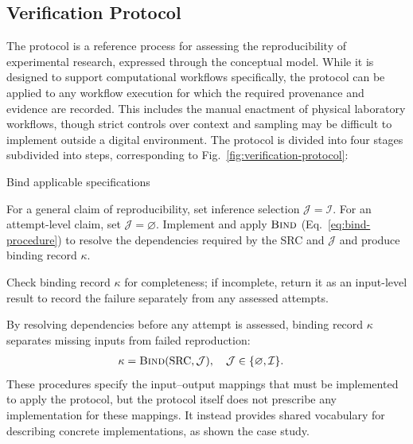 \documentclass[conference,a4paper]{IEEEtran}
\newlength{\PaperStrokeWidth}
\begin{document}
  \subsection{Verification Protocol}
  \label{sec:verification-protocol}
  The protocol is a reference process for assessing the reproducibility of experimental research, expressed through the conceptual model. While it is designed to support computational workflows specifically, the protocol can be applied to any workflow execution for which the required provenance and evidence are recorded. This includes the manual enactment of physical laboratory workflows, though strict controls over context and sampling may be difficult to implement outside a digital environment. The protocol is divided into four stages subdivided into steps, corresponding to Fig.~\ref{fig:verification-protocol}:

  \VerificationProtocolFigure{\PaperStrokeWidth}

  \begin{protocolstage}{Bind applicable specifications}
    \label{stage:protocol-bind}
    \item\label{step:protocol-bind}
      For a general claim of reproducibility, set inference selection $\mathcal J=\mathcal I$. For an attempt-level claim, set $\mathcal J=\varnothing$. Implement and apply $\operatorname{\textsc{Bind}}$ (Eq.~\eqref{eq:bind-procedure}) to resolve the dependencies required by the SRC and $\mathcal J$ and produce binding record $\kappa$.
    \item\label{step:protocol-inputs-bound}
      Check binding record $\kappa$ for completeness; if incomplete, return it as an input-level result to record the failure separately from any assessed attempts.
  \end{protocolstage}
  By resolving dependencies before any attempt is assessed, binding record $\kappa$ separates missing inputs from failed reproduction:
  \begin{align}
    \kappa &=\operatorname{\textsc{Bind}}(\mathrm{SRC},\mathcal J),
      \quad \mathcal J\in \{\varnothing,\mathcal I\}.
      \label{eq:bind-procedure}
  \end{align}
  These procedures specify the input--output mappings that must be implemented to apply the protocol, but the protocol itself does not prescribe any implementation for these mappings. It instead provides shared vocabulary for describing concrete implementations, as shown the case study. 
\end{document}
